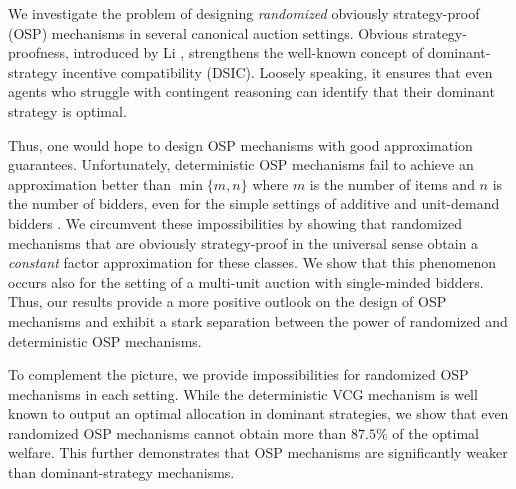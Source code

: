 We investigate the problem of designing \emph{randomized} obviously strategy-proof (OSP) mechanisms in several  canonical  auction settings. 
Obvious strategy-proofness, introduced by Li \cite{li}, strengthens the well-known concept of dominant-strategy incentive compatibility (DSIC). Loosely speaking, it ensures that even agents who struggle with contingent reasoning can identify that their dominant strategy is optimal.



Thus, one would hope to design OSP mechanisms with good approximation guarantees.
Unfortunately, 
deterministic OSP mechanisms fail to achieve an approximation better than $\min\{m,n\}$ where $m$ is the number of items and $n$ is the number of bidders, even 
for the simple settings of additive and unit-demand bidders \cite{Ron24}. 
We circumvent these impossibilities
by showing that randomized
mechanisms that are obviously strategy-proof in the universal sense obtain a \emph{constant} factor approximation for these classes. 
{We show that this phenomenon occurs also for the setting of a multi-unit auction with single-minded bidders.}
Thus, our results provide a more positive outlook on the design of OSP mechanisms and exhibit a stark separation between the power of randomized and deterministic OSP mechanisms.


To complement the picture, we provide impossibilities for randomized OSP mechanisms in each setting. While the deterministic VCG mechanism is well known to output an optimal allocation in dominant strategies, we show that even randomized OSP mechanisms cannot obtain more than $87.5\%$ of the optimal welfare. This further demonstrates that OSP mechanisms are significantly weaker than dominant-strategy mechanisms.


